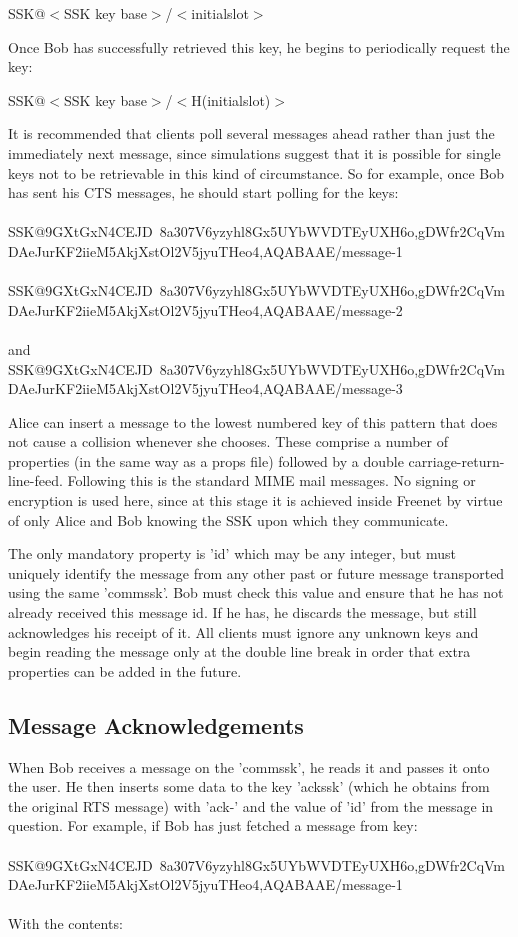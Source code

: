 \documentclass[12pt,a4paper]{article}
\begin{document}
SSK@$<$SSK key base$>$/$<$initialslot$>$

Once Bob has successfully retrieved this key, he begins to periodically request the key:

SSK@$<$SSK key base$>$/$<$H(initialslot)$>$

It is recommended that clients poll several messages ahead rather than just the immediately next message, since simulations suggest that it is possible for single keys not to be retrievable in this kind of circumstance. So for example, once Bob has sent his CTS messages, he should start polling for the keys: \\
\\
SSK@9GXtGxN4CEJD~8a\-307V6yzyhl8Gx5U\-YbWVDTEyUXH6o,gDWfr2CqVm\-DAeJurKF2iieM\-5AkjXstOl2V5j\-yuTHeo4,AQABAAE/message-1 \\
\\
SSK@9GXtGxN4CEJD~8a\-307V6yzyhl8Gx5U\-YbWVDTEyUXH6o,gDWfr2CqVm\-DAeJurKF2iieM\-5AkjXstOl2V5j\-yuTHeo4,AQABAAE/message-2 \\
\\
and \\
SSK@9GXtGxN4CEJD~8a\-307V6yzyhl8Gx5U\-YbWVDTEyUXH6o,gDWfr2CqVm\-DAeJurKF2iieM\-5AkjXstOl2V5j\-yuTHeo4,AQABAAE/message-3

Alice can insert a message to the lowest numbered key of this pattern that does not cause a collision whenever she chooses. These comprise a number of properties (in the same way as a props file) followed by a double carriage-return-line-feed. Following this is the standard MIME mail messages. No signing or encryption is used here, since at this stage it is achieved inside Freenet by virtue of only Alice and Bob knowing the SSK upon which they communicate.

The only mandatory property is 'id' which may be any integer, but must uniquely identify the message from any other past or future message transported using the same 'commssk'. Bob must check this value and ensure that he has not already received this message id. If he has, he discards the message, but still acknowledges his receipt of it. All clients must ignore any unknown keys and begin reading the message only at the double line break in order that extra properties can be added in the future.

\subsection{Message Acknowledgements}
When Bob receives a message on the 'commssk', he reads it and passes it onto the user. He then inserts some data to the key 'ackssk' (which he obtains from the original RTS message) with 'ack-' and the value of 'id' from the message in question. For example, if Bob has just fetched a message from key: \\
\\
SSK@9GXtGxN4CEJD~8a\-307V6yzyhl8Gx5U\-YbWVDTEyUXH6o,gDWfr2CqVm\-DAeJurKF2iieM\-5AkjXstOl2V5j\-yuTHeo4,AQABAAE/message-1 \\
\\
With the contents: \\
\\
\end{document}
